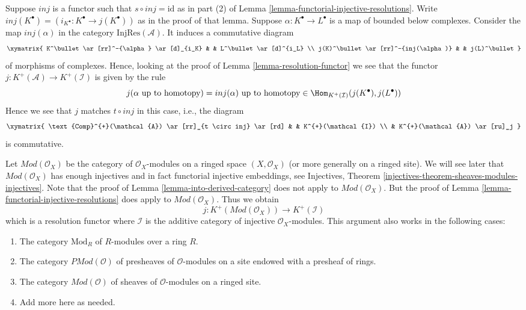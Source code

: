 \begin{remark}
\label{remark-match}
Suppose $inj$ is a functor such that $s \circ inj = \text{id}$
as in part (2) of
Lemma \ref{lemma-functorial-injective-resolutions}.
Write $inj(K^\bullet) = (i_{K^\bullet} : K^\bullet \to j(K^\bullet))$
as in the proof of that lemma.
Suppose $\alpha : K^\bullet \to L^\bullet$ is a map
of bounded below complexes. Consider the map
$inj(\alpha)$ in the category $\text{InjRes}(\mathcal{A})$.
It induces a commutative diagram
$$
\xymatrix{
K^\bullet
\ar[rr]^-{\alpha}
\ar[d]_{i_K} & &
L^\bullet \ar[d]^{i_L} \\
j(K)^\bullet
\ar[rr]^-{inj(\alpha)}
& &
j(L)^\bullet
}
$$
of morphisms of complexes.
Hence, looking at the proof of
Lemma \ref{lemma-resolution-functor}
we see that the functor $j : K^{+}(\mathcal{A}) \to K^{+}(\mathcal{I})$
is given by the rule
$$
j(\alpha\text{ up to homotopy}) = inj(\alpha)\text{ up to homotopy}\in
\Hom_{K^{+}(\mathcal{I})}(j(K^\bullet), j(L^\bullet))
$$
Hence we see that $j$ matches $t \circ inj$ in this case, i.e., the
diagram
$$
\xymatrix{
\text{Comp}^{+}(\mathcal{A}) \ar[rr]_{t \circ inj} \ar[rd] & &
K^{+}(\mathcal{I}) \\
& K^{+}(\mathcal{A}) \ar[ru]_j
}
$$
is commutative.
\end{remark}

\begin{remark}
\label{remark-big-abelian-category}
Let $\textit{Mod}(\mathcal{O}_X)$ be the category of $\mathcal{O}_X$-modules
on a ringed space $(X, \mathcal{O}_X)$ (or more generally on a
ringed site). We will see later that $\textit{Mod}(\mathcal{O}_X)$ has enough
injectives and in fact functorial injective embeddings, see
Injectives, Theorem \ref{injectives-theorem-sheaves-modules-injectives}.
Note that the proof of Lemma \ref{lemma-into-derived-category} does
not apply to $\textit{Mod}(\mathcal{O}_X)$. But the proof of
Lemma \ref{lemma-functorial-injective-resolutions} does apply
to $\textit{Mod}(\mathcal{O}_X)$. Thus we obtain
$$
j : K^{+}(\textit{Mod}(\mathcal{O}_X))
\longrightarrow
K^{+}(\mathcal{I})
$$
which is a resolution functor where $\mathcal{I}$ is the additive
category of injective $\mathcal{O}_X$-modules. This argument also
works in the following cases:
\begin{enumerate}
\item The category $\text{Mod}_R$ of $R$-modules over a ring $R$.
\item The category $\textit{PMod}(\mathcal{O})$ of presheaves of
$\mathcal{O}$-modules on a site endowed with a presheaf of rings.
\item The category $\textit{Mod}(\mathcal{O})$ of sheaves of
$\mathcal{O}$-modules on a ringed site.
\item Add more here as needed.
\end{enumerate}
\end{remark}









